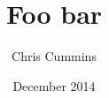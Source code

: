
\author{Chris Cummins}

\date{December 2014}

\title{Foo bar}
\newcommand{\multilinetitle}{Foo\\
                             bar}

\newcommand{\subtitle}{Baz}

\newcommand{\degreeTitle}{MSc by Research\\ Pervasive Parallelism}

\newcommand{\institution}{School of Informatics,\\
  The University of Edinburgh}













\tableofcontents
\listoffigures
\newpage



\newpage
\begin{appendices}
\end{appendices}

\newpage
\begin{thebibliography}{9}
\end{thebibliography}


